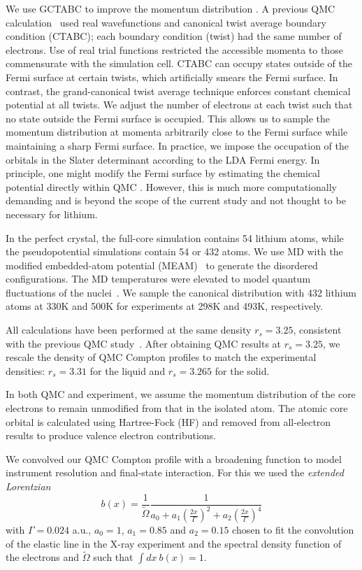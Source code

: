 We use GCTABC to improve the momentum distribution \cite{PhysRevLett.97.076404,Holzmann2009}. A previous QMC calculation~\cite{Filippi1999} used real wavefunctions and canonical twist average boundary condition (CTABC); each boundary condition (twist) had the same number of electrons. Use of real trial functions restricted the accessible momenta to those commensurate with the simulation cell. CTABC can occupy states outside of the Fermi surface at certain twists, which artificially smears the Fermi surface. In contrast, the grand-canonical twist average technique enforces constant chemical potential at all twists. We adjust the number of electrons at each twist such that no state outside the Fermi surface is occupied. This allows us to sample the momentum distribution at momenta arbitrarily close to the Fermi surface while maintaining a sharp Fermi surface. In practice, we impose the occupation of the orbitals in the Slater determinant according to the LDA Fermi energy. In principle, one might modify the Fermi surface by estimating the chemical potential directly within QMC \cite{yang2019electronic}. However, this is much more computationally demanding and is beyond the scope of the current study and not thought to be necessary for lithium.

In the perfect crystal, the full-core simulation contains 54 lithium atoms, while the pseudopotential simulations contain 54 or 432 atoms. We use MD with the modified embedded-atom potential (MEAM)~\cite{Baskes1992} to generate the disordered configurations.
The MD temperatures were elevated to model quantum fluctuations of the nuclei~\cite{Filippi1998}.
We sample the canonical distribution with 432 lithium atoms at 330K and 500K for experiments at 298K and 493K, respectively.

All calculations have been performed at the same density $r_s=3.25$, consistent with the previous QMC study~\cite{Filippi1999}. After obtaining QMC results at $r_s=3.25$, we rescale the density of QMC Compton profiles to match the experimental densities: $r_s=3.31$ for the liquid and $r_s=3.265$ for the solid.

In both QMC and experiment, we assume the momentum distribution of the core electrons to remain unmodified from that in the isolated atom. The atomic core orbital is calculated using Hartree-Fock (HF) and removed from all-electron results to produce valence electron contributions.

We convolved our QMC Compton profile with a broadening function to model instrument resolution and final-state interaction. For this we used the \emph{extended Lorentzian}
\begin{equation}
b(x) = \frac{1}{\tilde{\Omega}} \frac{1}{
a_0+a_1(\frac{2x}{\Gamma})^2+a_2(\frac{2x}{\Gamma})^4
}\label{eq:elorentz}
\end{equation}
with $\Gamma=0.024$ a.u., $a_0=1$, $a_1=0.85$ and $a_2=0.15$ chosen to fit the convolution of the elastic line in the X-ray experiment and the spectral density function of the electrons and $\tilde{\Omega}$ such that $\int dx ~b(x)=1$. 


